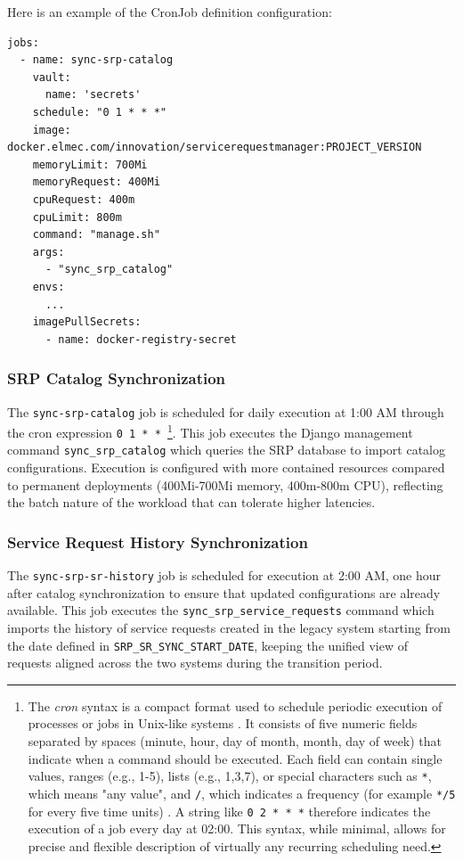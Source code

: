 Here is an example of the CronJob definition configuration:
\begin{verbatim}
jobs:
  - name: sync-srp-catalog
    vault:
      name: 'secrets'
    schedule: "0 1 * * *"
    image: docker.elmec.com/innovation/servicerequestmanager:PROJECT_VERSION
    memoryLimit: 700Mi
    memoryRequest: 400Mi
    cpuRequest: 400m
    cpuLimit: 800m
    command: "manage.sh"
    args:
      - "sync_srp_catalog"
    envs:
      ...
    imagePullSecrets:
      - name: docker-registry-secret
\end{verbatim}

\subsubsection{SRP Catalog Synchronization}
The \texttt{sync-srp-catalog} job is scheduled for daily execution at 1:00 AM through the cron expression \texttt{0 1 * * }\footnote{The \textit{cron} syntax is a compact format used to schedule periodic execution of processes or jobs in Unix-like systems \cite{cron}. It consists of five numeric fields separated by spaces (minute, hour, day of month, month, day of week) that indicate when a command should be executed. Each field can contain single values, ranges (e.g., 1-5), lists (e.g., 1,3,7), or special characters such as \texttt{*}, which means "any value", and \texttt{/}, which indicates a frequency (for example \texttt{*/5} for every five time units) \cite{cron}. A string like \texttt{0 2 * * *} therefore indicates the execution of a job every day at 02:00. This syntax, while minimal, allows for precise and flexible description of virtually any recurring scheduling need.}. This job executes the Django management command \texttt{sync\_srp\_catalog} which queries the SRP database to import catalog configurations. Execution is configured with more contained resources compared to permanent deployments (400Mi-700Mi memory, 400m-800m CPU), reflecting the batch nature of the workload that can tolerate higher latencies.

\subsubsection{Service Request History Synchronization}

The \texttt{sync-srp-sr-history} job is scheduled for execution at 2:00 AM, one hour after catalog synchronization to ensure that updated configurations are already available. This job executes the \texttt{sync\_srp\_service\_requests} command which imports the history of service requests created in the legacy system starting from the date defined in \texttt{SRP\_SR\_SYNC\_START\_DATE}, keeping the unified view of requests aligned across the two systems during the transition period.

